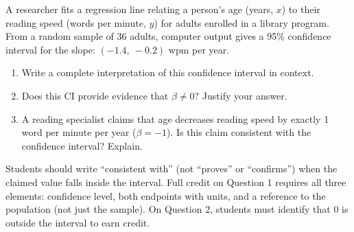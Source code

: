 \documentclass[10pt]{article}
\begin{document}
\namedateperiod

\vspace{0.1in}
A researcher fits a regression line relating a person's age (years, $x$) to their reading
speed (words per minute, $y$) for adults enrolled in a library program. From a random sample
of 36 adults, computer output gives a 95\% confidence interval for the slope:
$(-1.4,\ -0.2)$ wpm per year.

\begin{enumerate}

  \item Write a complete interpretation of this confidence interval in context.


  \item Does this CI provide evidence that $\beta \ne 0$? Justify your answer.


  \item A reading specialist claims that age decreases reading speed by exactly
        1 word per minute per year ($\beta = -1$). Is this claim consistent with the
        confidence interval? Explain.


\end{enumerate}

\begin{teachernote}
Students should write ``consistent with'' (not ``proves'' or ``confirms'') when the claimed
value falls inside the interval. Full credit on Question 1 requires all three elements:
confidence level, both endpoints with units, and a reference to the population (not just the
sample). On Question 2, students must identify that 0 is outside the interval to earn credit.
\end{teachernote}
\end{document}
